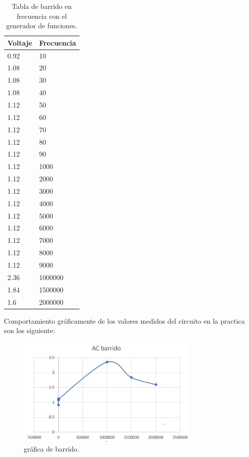 \documentclass[12pt]{report}
\begin{document}
\begin{table}[htbp]
\begin{center}
\begin{tabular}{|l|l|}
\hline
Voltaje & Frecuencia \\
\hline \hline
0.92  & 10\\ \hline
1.08  & 20\\ \hline
1.08  & 30 \\ \hline
1.08  & 40\\ \hline
1.12  & 50 \\ \hline
1.12  & 60 \\ \hline
1.12  & 70 \\ \hline
1.12  & 80 \\ \hline
1.12  & 90 \\ \hline
1.12  & 1000 \\ \hline
1.12  & 2000 \\ \hline
1.12  & 3000 \\ \hline
1.12  & 4000\\ \hline
1.12  & 5000 \\ \hline
1.12  & 6000 \\ \hline
1.12  & 7000 \\ \hline
1.12  & 8000 \\ \hline
1.12  & 9000\\ \hline
2.36  & 1000000 \\ \hline
1.84  & 1500000 \\ \hline
1.6   & 2000000 \\ \hline
\end{tabular}
\caption{Tabla de barrido en frecuencia con el generador de funciones.}

\label{tabla:sencilla}
\end{center}
\end{table}
Comportamiento gráficamente de los valores medidos del circuito en la practica son los siguiente:\\
\begin{figure}[h!]
  \centering
    \includegraphics[width=3.5in]{barrido}
  \caption{gráfica de barrido.}
  \end{figure}
\end{document}

